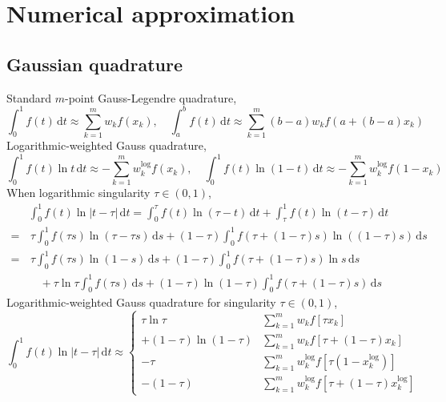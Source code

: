 \documentclass{jfm}
\begin{document}
\section{Numerical approximation}
\subsection{Gaussian  quadrature}
Standard $m$-point Gauss-Legendre quadrature,
\begin{equation}
\int_0^1 f(t)\,\mathrm{d}t\approx \sum_{k=1}^{m}w_k f(x_k),\quad
\int_a^b f(t)\,\mathrm{d}t\approx \sum_{k=1}^{m}(b-a)w_k f( a+(b-a)x_k)
\end{equation}
Logarithmic-weighted Gauss quadrature,
\begin{equation}
\int_0^1 f(t) \ln t \,\mathrm{d}t\approx -\sum_{k=1}^{m}w_k^\mathrm{log} f(x_k),\quad
\int_0^1 f(t) \ln (1-t) \,\mathrm{d}t\approx -\sum_{k=1}^{m}w_k^\mathrm{log} f(1-x_k)
\end{equation}
When logarithmic singularity $\tau\in (0,1)$,
\begin{align*}
&\int_0^1 f(t) \ln |t-\tau|\,\mathrm{d}t 
=\int_0^\tau f(t) \ln (\tau - t)\,\mathrm{d}t+\int_\tau^1 f(t) \ln (t-\tau)\,\mathrm{d}t\\
=&\,\tau\int_0^1 f(\tau s) \ln (\tau - \tau s)\,\mathrm{d}s
+(1-\tau) \int_0^1 f(\tau + (1-\tau) s) \ln ( (1-\tau) s)\,\mathrm{d}s\\
=&\,\tau\int_0^1 f(\tau s) \ln (1 - s)\,\mathrm{d} s
+(1-\tau) \int_0^1 f(\tau + (1-\tau) s) \ln s\,\mathrm{d}s\\
&\quad+\tau\ln\tau\int_0^1 f(\tau s) \,\mathrm{d} s
+(1-\tau)\ln (1-\tau) \int_0^1 f(\tau + (1-\tau) s) \,\mathrm{d}s
\end{align*}
Logarithmic-weighted Gauss quadrature for singularity $\tau\in (0,1)$,
\begin{equation}\int_0^1 f(t) \ln |t-\tau|\,\mathrm{d}t 
\approx\left\{ 
\begin{aligned}
\tau\ln\tau &\sum_{k=1}^m w_k f\left[\tau x_k\right] \\
+ (1- \tau)\ln(1-\tau) &\sum_{k=1}^m w_k f\left[\tau + (1-\tau)x_k\right]\\
- \tau &\sum_{k=1}^m w_k^\mathrm{log} f\left[\tau(1 -x_k^\mathrm{log})\right]\\
- (1- \tau) &\sum_{k=1}^m w_k^\mathrm{log} f\left[\tau + (1-\tau)x_k^\mathrm{log}\right]
\end{aligned}\right.
\end{equation}
\end{document}
